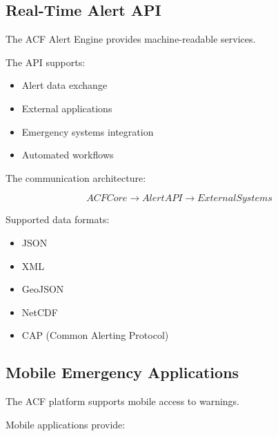 
\subsection{Real-Time Alert API}

The ACF Alert Engine provides machine-readable services.

The API supports:

\begin{itemize}

\item Alert data exchange

\item External applications

\item Emergency systems integration

\item Automated workflows

\end{itemize}


The communication architecture:

\[
ACFCore
\rightarrow
AlertAPI
\rightarrow
ExternalSystems
\]


Supported data formats:

\begin{itemize}

\item JSON

\item XML

\item GeoJSON

\item NetCDF

\item CAP (Common Alerting Protocol)

\end{itemize}



\subsection{Mobile Emergency Applications}

The ACF platform supports mobile access to warnings.

Mobile applications provide:

